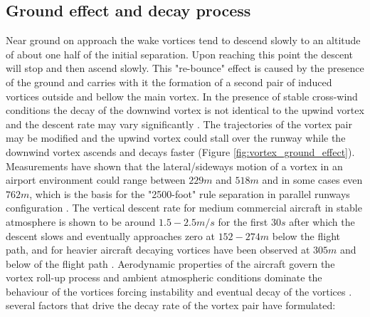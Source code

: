 \subsection{Ground effect and decay process}

Near ground on approach the wake vortices tend to descend slowly to an altitude of about one half of the initial separation.
Upon reaching this point the descent will stop and then ascend slowly. This "re-bounce" effect is caused by the presence of the ground and carries with it the formation of a second pair of induced vortices outside and bellow the main vortex. 
In the presence of stable cross-wind conditions the decay of the downwind vortex is not identical to the upwind vortex and the descent rate may vary significantly \cite{Hallock2018Apr}. 
The trajectories of the vortex pair may be modified and the upwind vortex could stall over the runway while the downwind vortex ascends and decays faster (Figure \ref{fig:vortex_ground_effect}).
Measurements have shown that the lateral/sideways motion of a vortex in an airport environment could range between $229 m$ and $518 m$ and in some cases even $762 m$, which is the basis for the "2500-foot"  rule separation in parallel runways configuration \cite{Hallock2018Apr, hallock2004summary, hallock2003wake}. The vertical descent rate for medium commercial aircraft in stable atmosphere  is shown to be around $1.5-2.5m/s$ for the first $30s$ after which the descent slows and eventually approaches zero at $152-274m$ below the flight path, and for heavier aircraft decaying vortices have been observed at $305m$ and below of the flight path  \cite{lissaman1973aircraft, Hallock2018Apr}. 
Aerodynamic properties of the aircraft govern the vortex roll-up process and ambient atmospheric conditions dominate the behaviour of the vortices forcing instability and eventual decay of the vortices \cite{Hallock2018Apr}.
several factors that drive the decay rate of the vortex pair have formulated:
